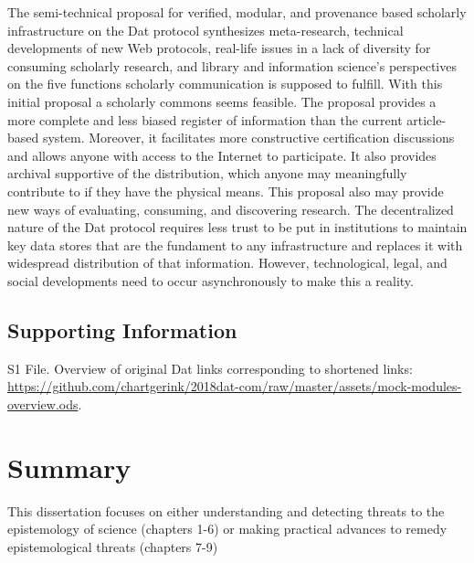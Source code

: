 \documentclass[a5paper]{book}
\begin{document}
The semi-technical proposal for verified, modular, and provenance based
scholarly infrastructure on the Dat protocol synthesizes meta-research,
technical developments of new Web protocols, real-life issues in a lack
of diversity for consuming scholarly research, and library and
information science's perspectives on the five functions scholarly
communication is supposed to fulfill. With this initial proposal a
scholarly commons seems feasible. The proposal provides a more complete
and less biased register of information than the current article-based
system. Moreover, it facilitates more constructive certification
discussions and allows anyone with access to the Internet to
participate. It also provides archival supportive of the distribution,
which anyone may meaningfully contribute to if they have the physical
means. This proposal also may provide new ways of evaluating, consuming,
and discovering research. The decentralized nature of the Dat protocol
requires less trust to be put in institutions to maintain key data
stores that are the fundament to any infrastructure and replaces it with
widespread distribution of that information. However, technological,
legal, and social developments need to occur asynchronously to make this
a reality.

\section{Supporting Information}\label{supporting-information-1}

S1 File. Overview of original Dat links corresponding to shortened
links:
\url{https://github.com/chartgerink/2018dat-com/raw/master/assets/mock-modules-overview.ods}.

\chapter*{Summary}\label{summary}

This dissertation focuses on either understanding and detecting threats
to the epistemology of science (chapters 1-6) or making practical
advances to remedy epistemological threats (chapters 7-9)
\end{document}

